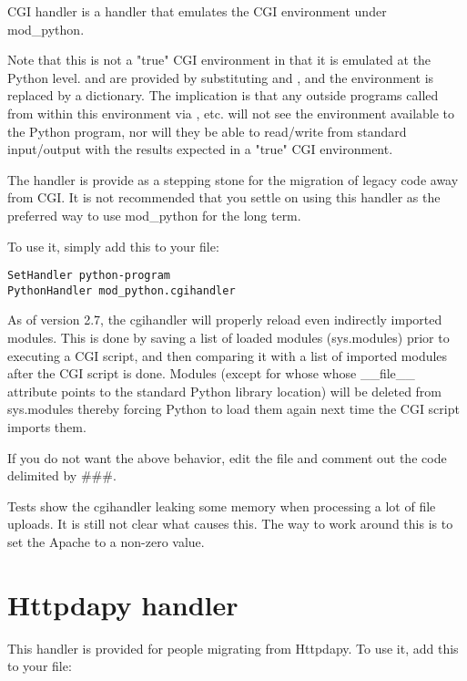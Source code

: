 CGI handler is a handler that emulates the CGI environment under mod_python. 

Note that this is not a "true" CGI environment in that it is emulated
at the Python level.  and  are provided by
substituting  and , and the environment
is replaced by a dictionary. The implication is that any outside programs
called from within this environment via , etc. will
not see the environment available to the Python program, nor will they
be able to read/write from standard input/output with the results expected
in a "true" CGI environment.

The handler is provide as a stepping stone for the migration of legacy
code away from CGI. It is not recommended that you settle on using
this handler as the preferred way to use mod_python for the long term.

To use it, simply add this to your  file: 

\begin{verbatim}
SetHandler python-program
PythonHandler mod_python.cgihandler
\end{verbatim}

As of version 2.7, the cgihandler will properly reload even indirectly
imported modules. This is done by saving a list of loaded modules
(sys.modules) prior to executing a CGI script, and then comparing it
with a list of imported modules after the CGI script is done.  Modules
(except for whose whose __file__ attribute points to the standard
Python library location) will be deleted from sys.modules thereby
forcing Python to load them again next time the CGI script imports
them.

If you do not want the above behavior, edit the 
file and comment out the code delimited by \#\#\#.

Tests show the cgihandler leaking some memory when processing a lot of
file uploads. It is still not clear what causes this. The way to work
around this is to set the Apache  to a non-zero
value.

\section{Httpdapy handler\label{hand-httpdapy}}

This handler is provided for people migrating from Httpdapy. To use
it, add this to your  file:

